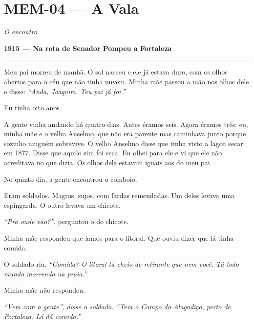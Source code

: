 \section*{\textbf{MEM-04} --- A Vala}

\noindent \textit{O encontro}

\noindent \textbf{1915 --- Na rota de Senador Pompeu a Fortaleza}

\vspace{0.5em}\noindent\rule{\textwidth}{0.5pt}\vspace{0.5em}

\noindent Meu pai morreu de manhã. O sol nasceu e ele já estava duro, com os olhos abertos para o céu que não tinha nuvem. Minha mãe passou a mão nos olhos dele e disse: \textit{\textquotedblleft{}Anda, Joaquim. Teu pai já foi.\textquotedblright{}}

\noindent Eu tinha oito anos.

\noindent A gente vinha andando há quatro dias. Antes éramos seis. Agora éramos três: eu, minha mãe e o velho Anselmo, que não era parente mas caminhava junto porque sozinho ninguém sobrevive. O velho Anselmo disse que tinha visto a lagoa secar em 1877. Disse que aquilo sim foi seca. Eu olhei para ele e vi que ele não acreditava no que dizia. Os olhos dele estavam iguais aos do meu pai.

\noindent No quinto dia, a gente encontrou o comboio.

\noindent Eram soldados. Magros, sujos, com fardas remendadas. Um deles levava uma espingarda. O outro levava um chicote.

\noindent \textit{\textquotedblleft{}Pra onde vão?\textquotedblright{}}, perguntou o do chicote.

\noindent Minha mãe respondeu que íamos para o litoral. Que ouviu dizer que lá tinha comida.

\noindent O soldado riu. \textit{\textquotedblleft{}Comida? O litoral tá cheio de retirante que nem você. Tá todo mundo morrendo na praia.\textquotedblright{}}

\noindent Minha mãe não respondeu.

\noindent \textit{\textquotedblleft{}Vem com a gente\textquotedblright{}\textit{, disse o soldado. }\textquotedblleft{}Tem o Campo do Alagadiço, perto de Fortaleza. Lá dá comida.\textquotedblright{}}


